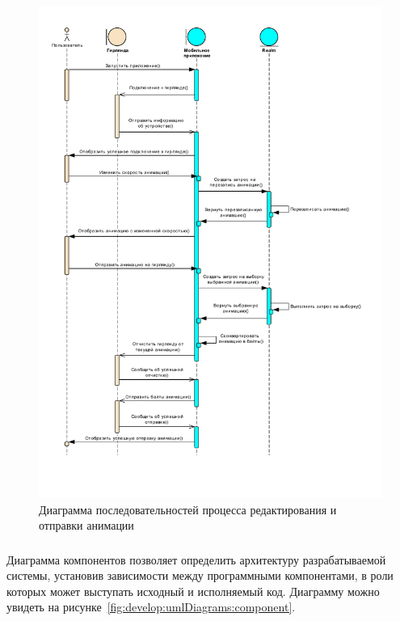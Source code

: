 ~
\begin{figure}[H]
\centering
	\includegraphics[scale=0.8]{figures/diagrams/uml_sequence.pdf}
	\caption{Диаграмма последовательностей процесса редактирования и отправки анимации}
	\label{fig:develop:umlDiagrams:sequence}
\end{figure}

\subsubsection{}	Диаграмма компонентов позволяет определить архитектуру разрабатываемой системы, установив зависимости между программными компонентами, в роли которых может выступать исходный  и исполняемый код. Диаграмму можно увидеть на рисунке~\ref{fig:develop:umlDiagrams:component}.

